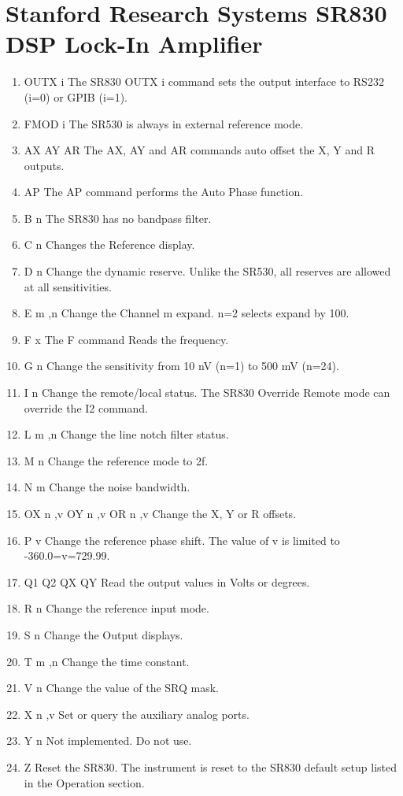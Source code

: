 \documentclass[10pt,letter,twoside]{report}
\begin{document}
\section{Stanford Research Systems SR830 DSP Lock-In Amplifier}
\begin{enumerate}
\item OUTX i The SR830 OUTX i command sets the output interface to RS232 (i=0) or GPIB (i=1). 
\item FMOD i The SR530 is always in external reference mode. 
\item AX AY AR The AX, AY and AR commands auto offset the X, Y and R outputs.  
\item AP The AP command performs the Auto Phase function. 
\item B {n} The SR830 has no bandpass filter. 
\item C {n} Changes the Reference display. 
\item D {n} Change the dynamic reserve. Unlike the SR530, all reserves are allowed at all sensitivities. 
\item E m {,n} Change the Channel m expand. n=2 selects expand by 100. 
\item F {x} The F command Reads the frequency.
\item G {n} Change the sensitivity from 10 nV (n=1) to 500 mV (n=24).
\item I {n} Change the remote/local status. The SR830 Override Remote mode can override the I2 command.
\item L m {,n} Change the line notch filter status.  
\item M {n} Change the reference mode to 2f. 
\item N {m} Change the noise bandwidth.
\item OX {n} {,v} OY {n} {,v} OR {n} {,v} Change the X, Y or R offsets. 
\item P {v} Change the reference phase shift. The value of v is limited to -360.0=v=729.99.
\item Q1 Q2 QX QY Read the output values in Volts or degrees. 
\item R {n} Change the reference input mode. 
\item S {n} Change the Output displays. 
\item T m {,n} Change the time constant. 
\item V {n} Change the value of the SRQ mask. 
\item X n {,v} Set or query the auxiliary analog ports. 
\item Y {n} Not implemented. Do not use. 
\item Z Reset the SR830. The instrument is reset to the SR830 default setup listed in the Operation section.
\end{enumerate}
\end{document}
